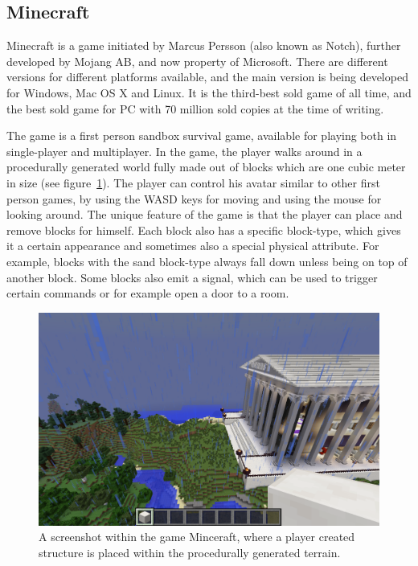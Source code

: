 \documentclass[11pt,twoside]{report} %
\begin{document}
\subsection{Minecraft}

Minecraft is a game initiated by Marcus Persson (also known as Notch), further developed by Mojang AB, and now property of Microsoft. There are different versions for different platforms available, and the main version is being developed for Windows, Mac OS X and Linux. It is the third-best sold game of all time, and the best sold game for PC with 70 million sold copies at the time of writing.

The game is a first person sandbox survival game, available for playing both in single-player and multiplayer. In the game, the player walks around in a procedurally generated world fully made out of blocks which are one cubic meter in size (see figure~\ref{fig:screenshot}). The player can control his avatar similar to other first person games, by using the WASD keys for moving and using the mouse for looking around. The unique feature of the game is that the player can place and remove blocks for himself. Each block also has a specific block-type, which gives it a certain appearance and sometimes also a special physical attribute. For example, blocks with the sand block-type always fall down unless being on top of another block. Some blocks also emit a signal, which can be used to trigger certain commands or for example open a door to a room.

\begin{figure}[h]
\centering
\includegraphics[width=\textwidth]{screenshot}
\caption{A screenshot within the game Minceraft, where a player created structure is placed within the procedurally generated terrain.\label{fig:screenshot}}
\end{figure}
\end{document}
